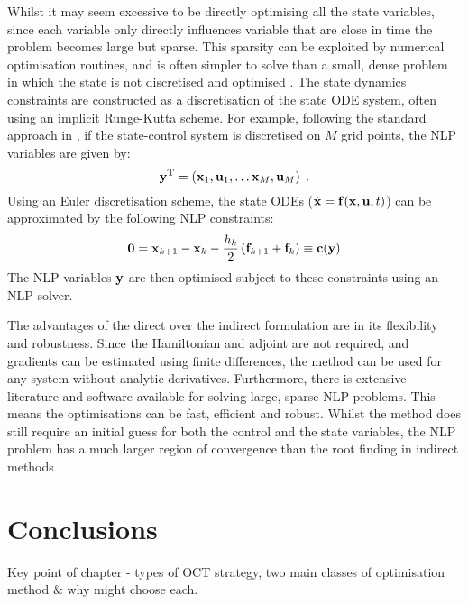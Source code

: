 Whilst it may seem excessive to be directly optimising all the state variables, since each variable only directly influences variable that are close in time the problem becomes large but sparse. This sparsity can be exploited by numerical optimisation routines, and is often simpler to solve than a small, dense problem in which the state is not discretised and optimised \citep{betts_practical_2010}. The state dynamics constraints are constructed as a discretisation of the state ODE system, often using an implicit Runge-Kutta scheme. For example, following the standard approach in \citet{betts_practical_2010}, if the state-control system is discretised on $M$ grid points, the NLP variables are given by:
\begin{equation}
    \mathbf{\bm{y}}^\mathrm{T} = \left(\mathbf{\bm{x}}_1, \mathbf{\bm{u}}_1, \ldots \mathbf{\bm{x}}_M, \mathbf{\bm{u}}_M\right)\;.
\end{equation}
Using an Euler discretisation scheme, the state ODEs ($\dot{\mathbf{\bm{x}}} = \mathbf{\bm{f}}(\mathbf{\bm{x}}, \mathbf{\bm{u}}, t)$) can be approximated by the following NLP constraints:
\begin{equation}
    \mathbf{\bm{0}} = \mathbf{\bm{x}}_{k+1} - \mathbf{\bm{x}}_k - \frac{h_k}{2}\left(\mathbf{\bm{f}}_{k+1} + \mathbf{\bm{f}}_k\right) \equiv \mathbf{\bm{c}}(\mathbf{\bm{y}})
\end{equation}
The NLP variables $\mathbf{\bm{y}}$ are then optimised subject to these constraints using an NLP solver.

The advantages of the direct over the indirect formulation are in its flexibility and robustness. Since the Hamiltonian and adjoint are not required, and gradients can be estimated using finite differences, the method can be used for any system without analytic derivatives. Furthermore, there is extensive literature and software available for solving large, sparse NLP problems. This means the optimisations can be fast, efficient and robust. Whilst the method does still require an initial guess for both the control and the state variables, the NLP problem has a much larger region of convergence than the root finding in indirect methods \citep{betts_practical_2010}.

\section{Conclusions}

Key point of chapter - types of OCT strategy, two main classes of optimisation method \& why might choose each.